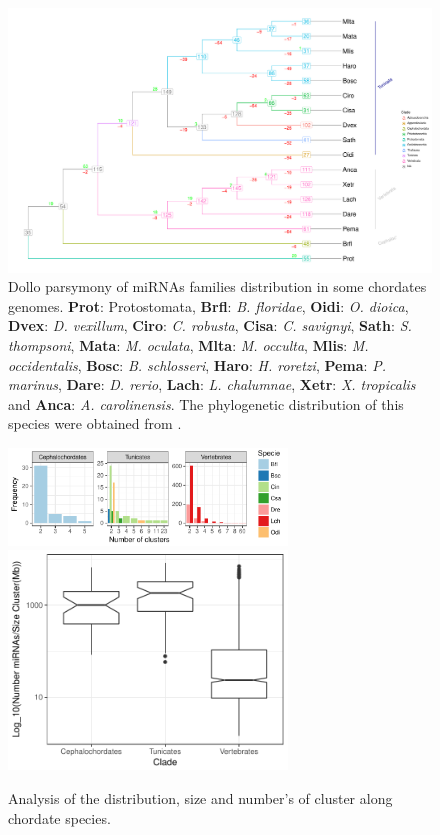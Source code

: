 \documentclass[graybox]{svmult}
\begin{document}
\begin{figure}[t]
\sidecaption[t]
\includegraphics[width=\textwidth]{./Images/last_tree_miRNAs}
\caption{Dollo parsymony of miRNAs families distribution in some 
chordates genomes. \textbf{Prot}: Protostomata, \textbf{Brfl}: \textit{B. floridae},
\textbf{Oidi}: \textit{O. dioica}, \textbf{Dvex}: \textit{D. vexillum},
\textbf{Ciro}: \textit{C. robusta}, \textbf{Cisa}: \textit{C. savignyi}, \textbf{Sath}: \textit{S. thompsoni},
\textbf{Mata}: \textit{M. oculata}, \textbf{Mlta}: \textit{M. occulta},
\textbf{Mlis}: \textit{M. occidentalis}, \textbf{Bosc}: \textit{B. schlosseri},
\textbf{Haro}: \textit{H. roretzi}, \textbf{Pema}: \textit{P. marinus},
\textbf{Dare}: \textit{D. rerio}, \textbf{Lach}: \textit{L. chalumnae},
\textbf{Xetr}: \textit{X. tropicalis} and \textbf{Anca}: \textit{A.
carolinensis}. The phylogenetic distribution of this species were obtained from \cite{Delsuc:2017, Kocot:2018}.}
\label{fig:dollotree}
\end{figure}

\begin{figure}[t]
\sidecaption[t]
\includegraphics[width=7.4cm]{./Images/cluster_number.pdf} \\ 
\includegraphics[width=7.4cm]{./Images/density.pdf} 
\caption{Analysis of the distribution, size and number's of cluster along 
chordate species.}
\label{fig:sizeCluster}
\end{figure}
\end{document}
